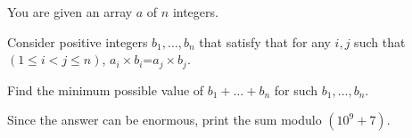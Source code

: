You are given an array $a$ of $n$ integers.

Consider positive integers $b_1$$,\dots,$$b_n$ that satisfy that for any $i,j$ such that $(1\le i < j \le n)$, $a_i \times b_i$=$a_j \times b_j$.

Find the minimum possible value of 
$b_1 +\dots+ b_n$ for such $b_1,\dots,b_n$.

Since the answer can be enormous, print the sum modulo $(10^9+7)$.